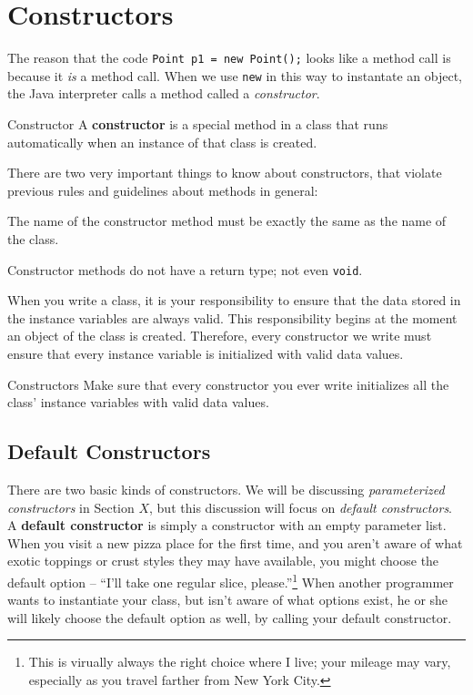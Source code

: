 \section{Constructors}

The reason that the code \texttt{Point p1 = new Point();} looks like a method call is because it \textit{is} a method call.  When we use \texttt{new} in this way to instantate an object, the Java interpreter calls a method called a \textit{constructor}.

\begin{defn}{Constructor}
    A \textbf{constructor} is a special method in a class that runs automatically when an instance of that class is created.
\end{defn}

There are two very important things to know about constructors, that violate previous rules and guidelines about methods in general:
\bi
\item The name of the constructor method must be exactly the same as the name of the class.
\item Constructor methods do not have a return type; not even \texttt{void}.
\ei

When you write a class, it is your responsibility to ensure that the data stored in the instance variables are always valid.  This responsibility begins at the moment an object of the class is created.  Therefore, every constructor we write must ensure that every instance variable is initialized with valid data values.

\begin{tip}{Constructors}
    Make sure that every constructor you ever write initializes all the class' instance variables with valid data values.
\end{tip}

\subsection{Default Constructors}

There are two basic kinds of constructors.  We will be discussing \textit{parameterized constructors} in Section $X$, but this discussion will focus on \textit{default constructors}.  A \textbf{default constructor} is simply a constructor with an empty parameter list.  When you visit a new pizza place for the first time, and you aren't aware of what exotic toppings or crust styles they may have available, you might choose the default option -- ``I'll take one regular slice, please.''\footnote{This is virually always the right choice where I live; your mileage may vary, especially as you travel farther from New York City.}  When another programmer wants to instantiate your class, but isn't aware of what options exist, he or she will likely choose the default option as well, by calling your default constructor.

